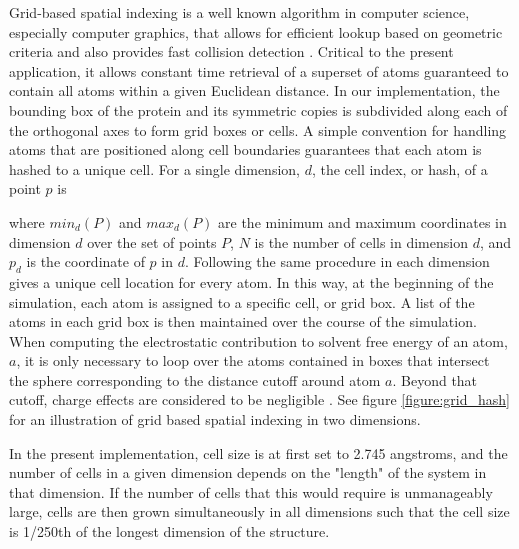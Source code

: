 Grid-based spatial indexing is a well known algorithm in computer science, especially computer graphics, that allows for efficient lookup based on geometric criteria and also provides fast collision detection \cite{bentley1979data}.
Critical to the present application, it allows constant time retrieval of a superset of atoms guaranteed to contain all atoms within a given Euclidean distance.
In our implementation, the bounding box of the protein and its symmetric copies is subdivided along each of the orthogonal axes to form grid boxes or cells.
A simple convention for handling atoms that are positioned along cell boundaries guarantees that each atom is hashed to a unique cell.
For a single dimension, $d$, the cell index, or hash, of a point $p$ is 

where $min_d(P)$ and $max_d(P)$ are the minimum and maximum coordinates in dimension $d$ over the set of points $P$, $N$ is the number of cells in dimension $d$, and $p_{d}$ is the coordinate of $p$ in $d$.
Following the same procedure in each dimension gives a unique cell location for every atom.
In this way, at the beginning of the simulation, each atom is assigned to a specific cell, or grid box.
A list of the atoms in each grid box is then maintained over the course of the simulation.
When computing the electrostatic contribution to solvent free energy of an atom, $a$, it is only necessary to loop over the atoms contained in boxes that intersect the sphere corresponding to the distance cutoff around atom $a$. 
Beyond that cutoff, charge effects are considered to be negligible \cite{gallicchio2004agbnp}.
See figure \ref{figure:grid_hash} for an illustration of grid based spatial indexing in two dimensions.

In the present implementation, cell size is at first set to 2.745 angstroms, and the number of cells in a given dimension depends on the "length" of the system in that dimension.
If the number of cells that this would require is unmanageably large, cells are then grown simultaneously in all dimensions such that the cell size is 1/250th of the longest dimension of the structure.

